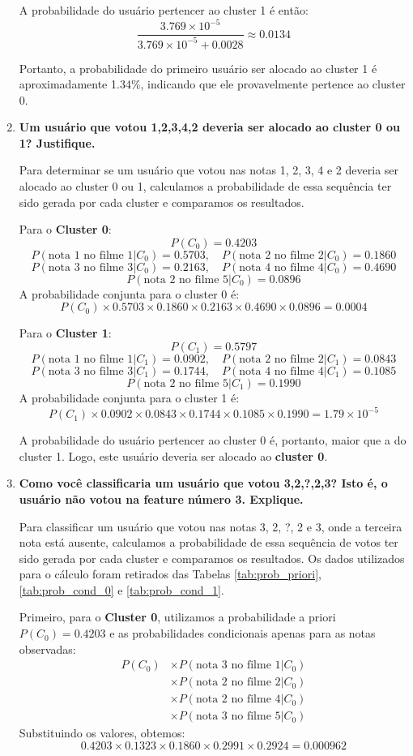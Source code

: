 \begin{enumerate}[label=(\alph*)]
    A probabilidade do usuário pertencer ao cluster 1 é então:
    \[
    \frac{3.769 \times 10^{-5}}{3.769 \times 10^{-5} + 0.0028} \approx 0.0134
    \]
    
    Portanto, a probabilidade do primeiro usuário ser alocado ao cluster 1 é aproximadamente 1.34\%, indicando que ele provavelmente pertence ao cluster 0.
    
    \item \textbf{Um usuário que votou 1,2,3,4,2 deveria ser alocado ao cluster 0 ou 1? Justifique.}
    
    Para determinar se um usuário que votou nas notas 1, 2, 3, 4 e 2 deveria ser alocado ao cluster 0 ou 1, calculamos a probabilidade de essa sequência ter sido gerada por cada cluster e comparamos os resultados.

Para o \textbf{Cluster 0}:
\[
P(C_0) = 0.4203
\]
\[
P(\text{nota 1 no filme 1}|C_0) = 0.5703, \quad P(\text{nota 2 no filme 2}|C_0) = 0.1860
\]
\[
P(\text{nota 3 no filme 3}|C_0) = 0.2163, \quad P(\text{nota 4 no filme 4}|C_0) = 0.4690
\]
\[
P(\text{nota 2 no filme 5}|C_0) = 0.0896
\]
A probabilidade conjunta para o cluster 0 é:
\[
P(C_0) \times 0.5703 \times 0.1860 \times 0.2163 \times 0.4690 \times 0.0896 = 0.0004
\]

Para o \textbf{Cluster 1}:
\[
P(C_1) = 0.5797
\]
\[
P(\text{nota 1 no filme 1}|C_1) = 0.0902, \quad P(\text{nota 2 no filme 2}|C_1) = 0.0843
\]
\[
P(\text{nota 3 no filme 3}|C_1) = 0.1744, \quad P(\text{nota 4 no filme 4}|C_1) = 0.1085
\]
\[
P(\text{nota 2 no filme 5}|C_1) = 0.1990
\]
A probabilidade conjunta para o cluster 1 é:
\[
P(C_1) \times 0.0902 \times 0.0843 \times 0.1744 \times 0.1085 \times 0.1990 = 1.79 \times 10^{-5}
\]

A probabilidade do usuário pertencer ao cluster 0 é, portanto, maior que a do cluster 1. Logo, este usuário deveria ser alocado ao \textbf{cluster 0}.

    \item \textbf{Como você classificaria um usuário que votou 3,2,?,2,3? Isto é, o usuário não votou na feature número 3. Explique.}
    
    Para classificar um usuário que votou nas notas 3, 2, ?, 2 e 3, onde a terceira nota está ausente, calculamos a probabilidade de essa sequência de votos ter sido gerada por cada cluster e comparamos os resultados. Os dados utilizados para o cálculo foram retirados das Tabelas \ref{tab:prob_priori}, \ref{tab:prob_cond_0} e \ref{tab:prob_cond_1}.

Primeiro, para o \textbf{Cluster 0}, utilizamos a probabilidade a priori \( P(C_0) = 0.4203 \) e as probabilidades condicionais apenas para as notas observadas:
\begin{align*}
    P(C_0) &\times P(\text{nota 3 no filme 1}|C_0) \\
    &\times P(\text{nota 2 no filme 2}|C_0) \\
    &\times P(\text{nota 2 no filme 4}|C_0) \\
    &\times P(\text{nota 3 no filme 5}|C_0)
\end{align*}    
Substituindo os valores, obtemos:
\[
0.4203 \times 0.1323 \times 0.1860 \times 0.2991 \times 0.2924 = 0.000962
\]


\end{enumerate}
